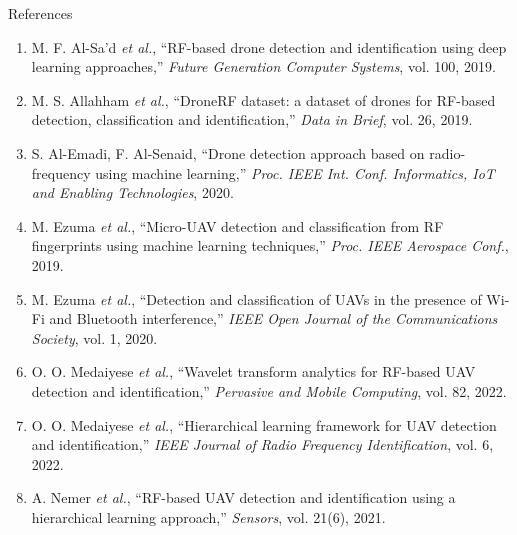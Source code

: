 \documentclass[aspectratio=169,11pt]{beamer}
\begin{document}
\begin{frame}{References}
\scriptsize
\begin{enumerate}
\item M. F. Al-Sa'd \textit{et al.}, ``RF-based drone detection and
identification using deep learning approaches,'' \textit{Future Generation
Computer Systems}, vol. 100, 2019.
\item M. S. Allahham \textit{et al.}, ``DroneRF dataset: a dataset of drones for
RF-based detection, classification and identification,'' \textit{Data in Brief},
vol. 26, 2019.
\item S. Al-Emadi, F. Al-Senaid, ``Drone detection approach based on
radio-frequency using machine learning,'' \textit{Proc. IEEE Int. Conf.
Informatics, IoT and Enabling Technologies}, 2020.
\item M. Ezuma \textit{et al.}, ``Micro-UAV detection and classification from RF
fingerprints using machine learning techniques,'' \textit{Proc. IEEE Aerospace
Conf.}, 2019.
\item M. Ezuma \textit{et al.}, ``Detection and classification of UAVs in the
presence of Wi-Fi and Bluetooth interference,'' \textit{IEEE Open Journal of the
Communications Society}, vol. 1, 2020.
\item O. O. Medaiyese \textit{et al.}, ``Wavelet transform analytics for
RF-based UAV detection and identification,'' \textit{Pervasive and Mobile
Computing}, vol. 82, 2022.
\item O. O. Medaiyese \textit{et al.}, ``Hierarchical learning framework for UAV
detection and identification,'' \textit{IEEE Journal of Radio Frequency
Identification}, vol. 6, 2022.
\item A. Nemer \textit{et al.}, ``RF-based UAV detection and identification using
a hierarchical learning approach,'' \textit{Sensors}, vol. 21(6), 2021.
\end{enumerate}
\end{frame}
\end{document}
